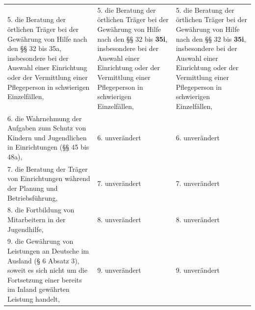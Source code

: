 \documentclass[10pt,a4paper,landscape]{article}
\begin{document}
\begin{longtable}{|L{8.2cm}|L{8.2cm}|L{8.2cm}|}
5.  \newline die Beratung der örtlichen Träger bei der  \newline Gewährung von Hilfe nach den \S{}\S{} 32 bis  \newline \textcolor{diffred}{35a,} insbesondere bei der Auswahl einer  \newline Einrichtung oder der Vermittlung einer  \newline Pflegeperson in schwierigen Einzelfällen, & 5.  \newline die Beratung der örtlichen Träger bei der  \newline Gewährung von Hilfe nach den \S{}\S{} 32 bis  \newline \textbf{35i}, insbesondere bei der Auswahl einer  \newline Einrichtung oder der Vermittlung einer  \newline Pflegeperson in schwierigen Einzelfällen, & 5.  \newline die Beratung der örtlichen Träger bei der  \newline Gewährung von Hilfe nach den \S{}\S{} 32 bis  \newline \textbf{35i}, insbesondere bei der Auswahl einer  \newline Einrichtung oder der Vermittlung einer  \newline Pflegeperson in schwierigen Einzelfällen, \\
\hhline{|---|}
6.  \newline die Wahrnehmung der Aufgaben zum  \newline Schutz von Kindern und Jugendlichen in  \newline Einrichtungen (\S{}\S{} 45 bis 48a), & 6. unverändert & 6. unverändert \\
\hhline{|---|}
7.  \newline die Beratung der Träger von Einrichtungen  \newline während der Planung und Betriebsführung, & 7. unverändert & 7. unverändert \\
\hhline{|---|}
8.  \newline die Fortbildung von Mitarbeitern in der  \newline Jugendhilfe, & 8. unverändert & 8. unverändert \\
\hhline{|---|}
9.  \newline die Gewährung von Leistungen an  \newline Deutsche im Ausland (\S{} 6 Absatz 3),  \newline soweit es sich nicht um die Fortsetzung  \newline einer bereits im Inland gewährten Leistung  \newline handelt, & 9. unverändert & 9. unverändert \\

\end{longtable}
\end{document}
